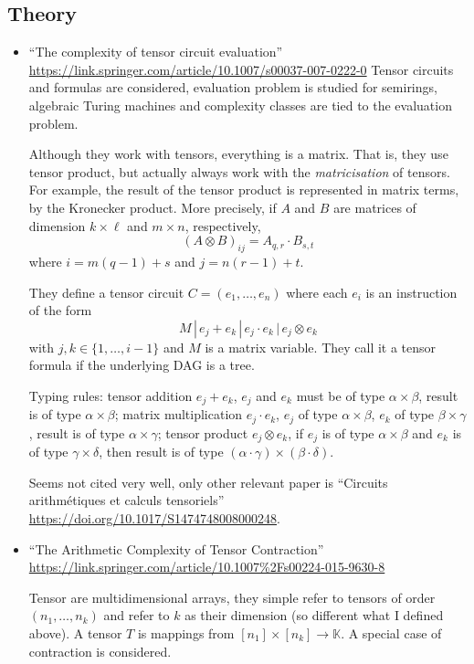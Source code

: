 \subsection{Theory}
\begin{itemize}
\item ``The complexity of tensor circuit evaluation''
 \url{https://link.springer.com/article/10.1007/s00037-007-0222-0} 
Tensor circuits and formulas are considered, evaluation problem is studied for semirings, algebraic Turing machines and complexity classes are tied to the evaluation problem.
 
Although they work with tensors, everything is a matrix. That is, they use tensor product, but actually always work with the \textit{matricisation} of tensors.
For example, the result of the tensor product is represented in matrix terms, by the Kronecker product.
More precisely, if $A$ and $B$ are matrices of dimension $k\times \ell$ and $m\times n$, respectively,
$$
(A\otimes B)_{ij}=A_{q,r}\cdot B_{s,t}
$$ 
where $i=m(q-1)+s$ and $j=n(r-1)+t$.
 
 They define a tensor circuit $C=(e_{1},\ldots,e_{n})$ 
  where each $e_{i}$ is an instruction of the form
 $$ M \,|\, e_{j}+e_{k} \,|\, e_{j}\cdot e_{k} \,|\, e_{j}\otimes e_{k} $$
 with $j,k\in \{1,\ldots,i-1\}$ and $M$ is a matrix variable. They call it a tensor formula
 if the underlying DAG is a tree.
 
 Typing rules: tensor addition $e_{j}+e_{k}$, $e_j$ and $e_k$ must be of type $\alpha\times\beta$, result is of type $\alpha\times\beta$;
matrix multiplication $e_{j}\cdot e_{k}$, $e_j$ of type $\alpha\times\beta$, $e_k$ of type
$\beta\times \gamma$, result is of type $\alpha\times\gamma$;
tensor product $e_{j}\otimes e_{k}$, if $e_j$ is of type $\alpha\times\beta$ and $e_k$ is of type $\gamma\times\delta$, then result is of type $(\alpha\cdot \gamma)\times (\beta\cdot\delta)$.

Seems not cited very well, only other relevant paper is 
``Circuits arithmétiques et calculs tensoriels'' \url{https://doi.org/10.1017/S1474748008000248}.
  
\item ``The Arithmetic Complexity of Tensor Contraction''
\url{https://link.springer.com/article/10.1007%2Fs00224-015-9630-8}

Tensor are multidimensional arrays, they simple refer to tensors of order $(n_1,\ldots,n_k)$ and refer to $k$ as their dimension (so different what I defined above). A tensor $T$ is mappings from $[n_1]\times [n_k]\to \mathbb{K}$. A special case of contraction is considered.


\end{itemize}
